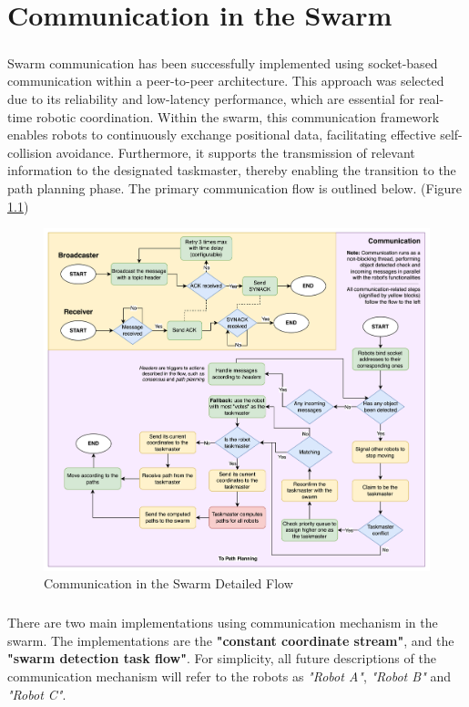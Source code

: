 \chapter{Communication in the Swarm}

\paragraph*{}
Swarm communication has been successfully implemented using socket-based communication within a peer-to-peer architecture. This approach was selected due to its reliability and low-latency performance, which are essential for real-time robotic coordination. Within the swarm, this communication framework enables robots to continuously exchange positional data, facilitating effective self-collision avoidance. Furthermore, it supports the transmission of relevant information to the designated taskmaster, thereby enabling the transition to the path planning phase. The primary communication flow is outlined below. (Figure \ref{fig:communication-flow})

\begin{figure}[H]
    \centering
    \includegraphics[width=0.85\linewidth]{assets/images/communication/communication-flow.png}
    \caption{Communication in the Swarm Detailed Flow}
    \label{fig:communication-flow}
\end{figure}

\paragraph*{}
There are two main implementations using communication mechanism in the swarm. The implementations are the \textbf{"constant coordinate stream"}, and the \textbf{"swarm detection task flow"}. For simplicity, all future descriptions of the communication mechanism will refer to the robots as \textit{"Robot A"}, \textit{"Robot B"} and \textit{"Robot C"}.

